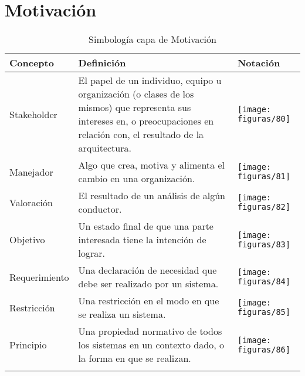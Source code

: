 \section{Motivación}
  \begin{longtable}
  	{m{3cm}m{4.8cm}m{5.2cm}}
  	\hline
  	\rowcolor[HTML]{0073a1}
  	{\color[HTML]{FFFFFF} \textbf{Concepto}} & {\color[HTML]{FFFFFF} \textbf{Definición}} & {\color[HTML]{FFFFFF} \textbf{Notación}} \\
  	\hline
  	Stakeholder\index{Stakeholder} & El papel de un individuo, equipo u organización (o clases de los mismos) que representa sus intereses en, o preocupaciones en relación con, el resultado de la arquitectura. & \texttt{[image: figuras/80]} \\ \hline
  	Manejador\index{Manejador} & Algo que crea, motiva y alimenta el cambio en una organización. & \texttt{[image: figuras/81]} \\ \hline
  	Valoración & El resultado de un análisis de algún conductor. & \texttt{[image: figuras/82]} \\ \hline
  	Objetivo & Un estado final de que una parte interesada tiene la intención de lograr. & \texttt{[image: figuras/83]} \\ \hline
  	Requerimiento & Una declaración de necesidad que debe ser realizado por un sistema. & \texttt{[image: figuras/84]} \\ \hline
  	Restricción & Una restricción en el modo en que se realiza un sistema. & \texttt{[image: figuras/85]} \\ \hline
  	Principio\index{Principio} & Una propiedad normativo de todos los sistemas en un contexto dado, o la forma en que se realizan. & \texttt{[image: figuras/86]} \\
	\bottomrule
	\captionsetup{width=.95\textwidth}
	\caption{Simbología\index{Simbología} capa de Motivación \cite{ref9}}
	\label{tabla35}
  \end{longtable}

\newpage
